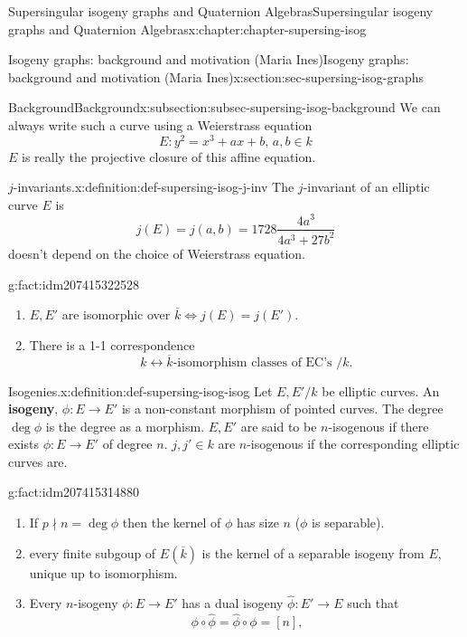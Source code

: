 \documentclass[oneside,10pt,]{book}
\newcommand{\terminology}[1]{\textbf{#1}}
\numberwithin{equation}{section}
\newcommand{\lb}{[}
\newcommand{\rb}{]}
\begin{document}
\begin{chapterptx}{Supersingular isogeny graphs and Quaternion Algebras}{}{Supersingular isogeny graphs and Quaternion Algebras}{}{}{x:chapter:chapter-supersing-isog}
\begin{sectionptx}{Isogeny graphs: background and motivation (Maria Ines)}{}{Isogeny graphs: background and motivation (Maria Ines)}{}{}{x:section:sec-supersing-isog-graphs}
\begin{subsectionptx}{Background}{}{Background}{}{}{x:subsection:subsec-supersing-isog-background}
We can always write such a curve using a Weierstrass equation%
\begin{equation*}
E\colon y^2=  x^3  + ax  +b,\,a,b    \in k
\end{equation*}
\(E\) is really the projective closure of this affine equation.%
\begin{definition}{\(j\)-invariants.}{x:definition:def-supersing-isog-j-inv}%
The \(j\)-invariant of an elliptic curve \(E\) is%
\begin{equation*}
j(E) = j(a,b) = 1728 \frac{4a^3}{4a^3 + 27b^2}
\end{equation*}
doesn't depend on the choice of Weierstrass equation.%
\end{definition}
\begin{fact}{}{}{g:fact:idm207415322528}%
%
\begin{enumerate}
\item{}\(E,E'\) are isomorphic over \(\overline k \iff j(E)  = j(E')\).%
\item{}There is a 1-1 correspondence%
\begin{equation*}
k \leftrightarrow \overline k \text{-isomorphism classes of EC's }/k\text{.}
\end{equation*}
%
\end{enumerate}
%
\end{fact}
\begin{definition}{Isogenies.}{x:definition:def-supersing-isog-isog}%
Let \(E,E'/k\) be elliptic curves. An \terminology{isogeny}, \(\phi \colon E\to E'\) is a non-constant morphism of pointed curves. The degree \(\deg \phi \) is the degree as a morphism. \(E,E'\) are said to be \(n\)-isogenous if there exists \(\phi\colon E\to E'\) of degree \(n\). \(j,j'\in k\) are \(n\)-isogenous if the corresponding elliptic curves are.%
\end{definition}
\begin{fact}{}{}{g:fact:idm207415314880}%
%
\begin{enumerate}
\item{}If \(p \nmid n = \deg \phi\) then the kernel of \(\phi\) has size \(n\) (\(\phi\) is separable).%
\item{}every finite subgoup of \(E(\overline k )\) is the kernel of a separable isogeny from \(E\), unique up to isomorphism.%
\item{}Every \(n\)-isogeny \(\phi\colon E \to E'\) has  a dual isogeny \(\hat \phi \colon E' \to E\) such that%
\begin{equation*}
\phi\circ \hat\phi = \hat\phi \circ \phi = \lb n \rb\text{,}

\end{equation*}
\end{enumerate}
\end{fact}
\end{subsectionptx}
\end{sectionptx}
\end{chapterptx}
\end{document}
